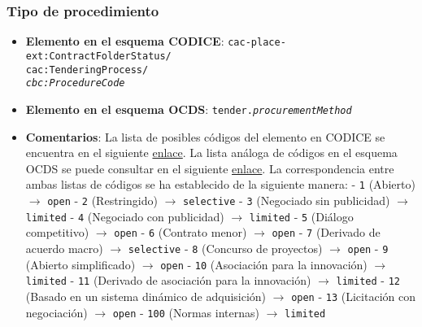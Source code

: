         \subsubsection{Tipo de procedimiento}
            \begin{itemize}
                \item \textbf{Elemento en el esquema CODICE}:
                    \tabto{7.6cm} \texttt{cac-place-ext:ContractFolderStatus/} \\
                    \tabto{7.6cm} \texttt{cac:TenderingProcess/} \\
                    \tabto{7.6cm} \texttt{\textit{cbc:ProcedureCode}}
                \item \textbf{Elemento en el esquema OCDS}:
                    \tabto{7.6cm} \texttt{tender.\textit{procurementMethod}}
                \item \textbf{Comentarios}: La lista de posibles códigos del elemento en CODICE se encuentra en el siguiente 
                    \href{https://contrataciondelestado.es/codice/cl/2.07/SyndicationTenderingProcessCode-2.07.gc}{enlace}.
                    La lista análoga de códigos en el esquema OCDS se puede consultar en el siguiente
                    \href{https://standard.open-contracting.org/latest/es/schema/codelists/#method}{enlace}.
                    La correspondencia entre ambas listas de códigos se ha establecido de la siguiente manera:
                        \subitem - \texttt{1} (Abierto) $\rightarrow$ \texttt{open}
                        \subitem - \texttt{2} (Restringido) $\rightarrow$ \texttt{selective}
                        \subitem - \texttt{3} (Negociado sin publicidad) $\rightarrow$ \texttt{limited}
                        \subitem - \texttt{4} (Negociado con publicidad) $\rightarrow$ \texttt{limited}
                        \subitem - \texttt{5} (Diálogo competitivo) $\rightarrow$ \texttt{open}
                        \subitem - \texttt{6} (Contrato menor) $\rightarrow$ \texttt{open}
                        \subitem - \texttt{7} (Derivado de acuerdo macro) $\rightarrow$ \texttt{selective}
                        \subitem - \texttt{8} (Concurso de proyectos) $\rightarrow$ \texttt{open}
                        \subitem - \texttt{9} (Abierto simplificado) $\rightarrow$ \texttt{open}
                        \subitem - \texttt{10} (Asociación para la innovación) $\rightarrow$ \texttt{limited}
                        \subitem - \texttt{11} (Derivado de asociación para la innovación) $\rightarrow$ \texttt{limited}
                        \subitem - \texttt{12} (Basado en un sistema dinámico de adquisición) $\rightarrow$ \texttt{open}
                        \subitem - \texttt{13} (Licitación con negociación) $\rightarrow$ \texttt{open}
                        \subitem - \texttt{100} (Normas internas) $\rightarrow$ \texttt{limited}
            \end{itemize}
        

